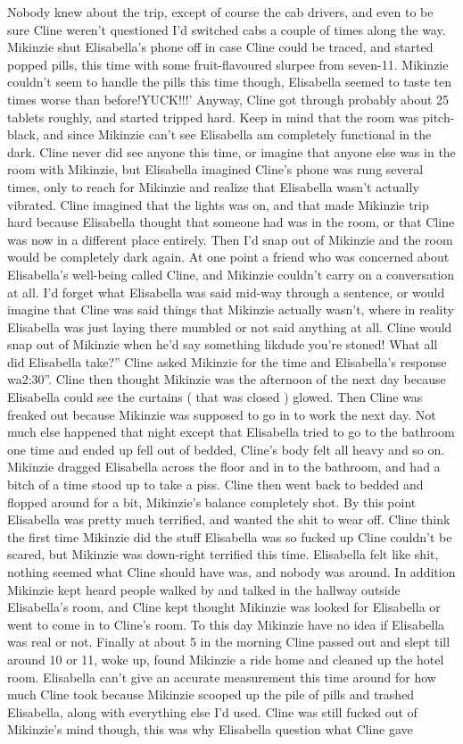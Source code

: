 \documentclass[12pt]{book}
\begin{document}
Nobody knew about the trip, except of course the cab drivers, and even to be sure Cline weren't questioned I'd switched cabs a couple of times along the way. Mikinzie shut Elisabella's phone off in case Cline could be traced, and started popped pills, this time with some fruit-flavoured slurpee from seven-11. Mikinzie couldn't seem to handle the pills this time though, Elisabella seemed to taste ten times worse than before!YUCK!!!' Anyway, Cline got through probably about 25 tablets roughly, and started tripped hard. Keep in mind that the room was pitch-black, and since Mikinzie can't see Elisabella am completely functional in the dark. Cline never did see anyone this time, or imagine that anyone else was in the room with Mikinzie, but Elisabella imagined Cline's phone was rung several times, only to reach for Mikinzie and realize that Elisabella wasn't actually vibrated. Cline imagined that the lights was on, and that made Mikinzie trip hard because Elisabella thought that someone had was in the room, or that Cline was now in a different place entirely. Then I'd snap out of Mikinzie and the room would be completely dark again. At one point a friend who was concerned about Elisabella's well-being called Cline, and Mikinzie couldn't carry on a conversation at all. I'd forget what Elisabella was said mid-way through a sentence, or would imagine that Cline was said things that Mikinzie actually wasn't, where in reality Elisabella was just laying there mumbled or not said anything at all. Cline would snap out of Mikinzie when he'd say something likdude you're stoned! What all did Elisabella take?'' Cline asked Mikinzie for the time and Elisabella's response wa2:30''. Cline then thought Mikinzie was the afternoon of the next day because Elisabella could see the curtains ( that was closed ) glowed. Then Cline was freaked out because Mikinzie was supposed to go in to work the next day. Not much else happened that night except that Elisabella tried to go to the bathroom one time and ended up fell out of bedded, Cline's body felt all heavy and so on. Mikinzie dragged Elisabella across the floor and in to the bathroom, and had a bitch of a time stood up to take a piss. Cline then went back to bedded and flopped around for a bit, Mikinzie's balance completely shot. By this point Elisabella was pretty much terrified, and wanted the shit to wear off. Cline think the first time Mikinzie did the stuff Elisabella was so fucked up Cline couldn't be scared, but Mikinzie was down-right terrified this time. Elisabella felt like shit, nothing seemed what Cline should have was, and nobody was around. In addition Mikinzie kept heard people walked by and talked in the hallway outside Elisabella's room, and Cline kept thought Mikinzie was looked for Elisabella or went to come in to Cline's room. To this day Mikinzie have no idea if Elisabella was real or not. Finally at about 5 in the morning Cline passed out and slept till around 10 or 11, woke up, found Mikinzie a ride home and cleaned up the hotel room. Elisabella can't give an accurate measurement this time around for how much Cline took because Mikinzie scooped up the pile of pills and trashed Elisabella, along with everything else I'd used. Cline was still fucked out of Mikinzie's mind though, this was why Elisabella question what Cline gave 
\end{document}
